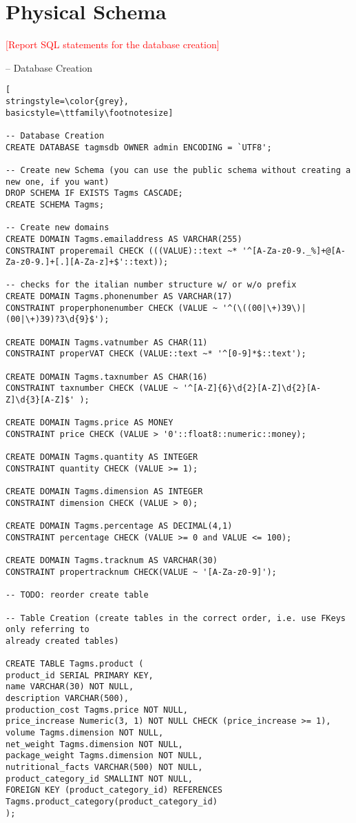 \section{Physical Schema}
\textcolor{red}{[Report SQL statements for the database creation]}

-- Database Creation
\begin{lstlisting}[
stringstyle=\color{grey},
basicstyle=\ttfamily\footnotesize]

-- Database Creation
CREATE DATABASE tagmsdb OWNER admin ENCODING = `UTF8';

-- Create new Schema (you can use the public schema without creating a new one, if you want)
DROP SCHEMA IF EXISTS Tagms CASCADE;
CREATE SCHEMA Tagms;

-- Create new domains
CREATE DOMAIN Tagms.emailaddress AS VARCHAR(255)
CONSTRAINT properemail CHECK (((VALUE)::text ~* '^[A-Za-z0-9._%]+@[A-Za-z0-9.]+[.][A-Za-z]+$'::text));

-- checks for the italian number structure w/ or w/o prefix
CREATE DOMAIN Tagms.phonenumber AS VARCHAR(17)
CONSTRAINT properphonenumber CHECK (VALUE ~ '^(\((00|\+)39\)|(00|\+)39)?3\d{9}$');

CREATE DOMAIN Tagms.vatnumber AS CHAR(11)
CONSTRAINT properVAT CHECK (VALUE::text ~* '^[0-9]*$::text');

CREATE DOMAIN Tagms.taxnumber AS CHAR(16)
CONSTRAINT taxnumber CHECK (VALUE ~ '^[A-Z]{6}\d{2}[A-Z]\d{2}[A-Z]\d{3}[A-Z]$' );

CREATE DOMAIN Tagms.price AS MONEY
CONSTRAINT price CHECK (VALUE > '0'::float8::numeric::money);

CREATE DOMAIN Tagms.quantity AS INTEGER
CONSTRAINT quantity CHECK (VALUE >= 1);

CREATE DOMAIN Tagms.dimension AS INTEGER
CONSTRAINT dimension CHECK (VALUE > 0);

CREATE DOMAIN Tagms.percentage AS DECIMAL(4,1)
CONSTRAINT percentage CHECK (VALUE >= 0 and VALUE <= 100);

CREATE DOMAIN Tagms.tracknum AS VARCHAR(30)
CONSTRAINT propertracknum CHECK(VALUE ~ '[A-Za-z0-9]');

-- TODO: reorder create table

-- Table Creation (create tables in the correct order, i.e. use FKeys only referring to
already created tables)

CREATE TABLE Tagms.product (
product_id SERIAL PRIMARY KEY,
name VARCHAR(30) NOT NULL,
description VARCHAR(500),
production_cost Tagms.price NOT NULL,
price_increase Numeric(3, 1) NOT NULL CHECK (price_increase >= 1),
volume Tagms.dimension NOT NULL,
net_weight Tagms.dimension NOT NULL,
package_weight Tagms.dimension NOT NULL,
nutritional_facts VARCHAR(500) NOT NULL,
product_category_id SMALLINT NOT NULL,
FOREIGN KEY (product_category_id) REFERENCES Tagms.product_category(product_category_id)
);


\end{lstlisting}
